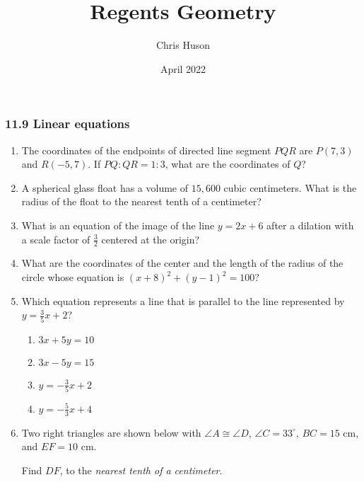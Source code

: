 \documentclass[12pt, oneside]{article}
\title{Regents Geometry}
\author{Chris Huson}
\date{April 2022}
\begin{document}
\subsubsection*{11.9 Linear equations}
\begin{enumerate}[itemsep=2cm]
\item The coordinates of the endpoints of directed line segment $PQR$ are $P(7,3)$ and $R(-5,7)$. If $PQ:QR = 1:3$, what are the coordinates of $Q$? \vspace{1.5cm}

\item A spherical glass float has a volume of $15,600$ cubic centimeters. What is the radius of the float to the nearest tenth of a centimeter? \vspace{1.5cm}

\item What is an equation of the image of the line $\displaystyle y=2x+6$ after a dilation with a scale factor of $\displaystyle \frac{3}{2}$ centered at the origin?

\item What are the coordinates of the center and the length of the radius of the circle whose equation is $(x+8)^2+(y-1)^2=100$? \vspace{1cm}

\item Which equation represents a line that is parallel to the line represented by\\[0.25cm] $\displaystyle y=\frac{3}{5}x+2$?
  \begin{multicols}{2}
    \begin{enumerate}
      \item $3x+5y=10$
      \item $3x-5y=15$ 
      \item $\displaystyle y=-\frac{3}{5}x+2$
      \item $\displaystyle y=-\frac{5}{3}x+4$
    \end{enumerate}
  \end{multicols}

\newpage
\item Two right triangles are shown below with $\angle A \cong \angle D$, $\angle C=33^\circ$, $BC=15$ cm, and $EF=10$ cm.
  \begin{center}
  \end{center}
Find $DF$, to the \emph{nearest tenth of a centimeter}. \vspace{2cm}


\end{enumerate}
\end{document}
